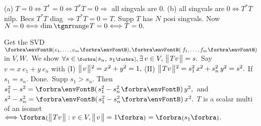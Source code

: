 
\vspace{6pt}


(a) $T=0\Longleftrightarrow T^*=0\Longleftrightarrow T^*T=0\Rightarrow$ all singvals are $0.$\parSol{}
(b) all singvals are $0\Longleftrightarrow T^*T$ nilp. Becs $T^*T$ diag $\Rightarrow T^*T=0=T.$\PfEnd\vspace{2pt}\parSol{}
\Or Supp $T$ has $N$ posi singvals. Now $N=0\Longleftrightarrow\dim\range T=0\Longleftrightarrow T=0.$\PfEnd
\SepLine

Get the SVD $\Par{e_1,\dots,e_m},\Par{\,f_1,\dots,f_m}$ in $V,W.$ \,We show $\forall s\in\;\!\!\Interval{[}{]}{s_n,\,s_1},\exists\,v\in V,\,\Dvert{Tv}=s.$\vspace{1pt}\parSol{}
Say $v=x\:\!e_1+y\:\!e_n$ with (I) $\big\Vert\hspace{1pt}{}v{}\hspace{1pt}\big\Vert{\hspace{0.5pt}}{^2}=x^2+y^2=1,$ (II) $\big\Vert\hspace{1pt}{}Tv{}\hspace{1pt}\big\Vert{\hspace{0.5pt}}{^2}=s_1^2\,x^2+s_n^2\,y^2=s^2.$\vspace{1pt}\parSol{}
If $s_1=s_n.$ Done. \,Supp $s_1>s_n.$ Then \,$s_1^2-s^2=\Par{s_1^2-s_n^2}\,y^2,$ \,and \:$s^2-s_n^2=\Par{s_1^2-s_n^2}\,x^2.$\PfEnd\vspace{3pt}
\AComm $T$ is a scalar multi of an isomet $\Longleftrightarrow\Bra{\Dvert{Tv}:v\in V,\Dvert{v}=1}=\Bra{s_1}.$
\SepLine

